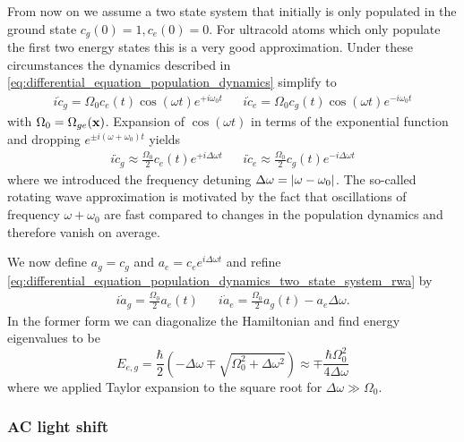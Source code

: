 From now on we assume a two state system that initially is only populated in
the ground state $c_g(0)=1,c_e(0)=0$. For ultracold atoms which only populate
the first two energy states this is a very good approximation. Under these
circumstances the dynamics described in
\cref{eq:differential_equation_population_dynamics} simplify to
\begin{align}
  i\dot{c}_g=\Omega_0c_e(t)\cos(\omega t)e^{+i\omega_0 t} &&
  i\dot{c}_e=\Omega_0c_g(t)\cos(\omega t)e^{-i\omega_0 t}
  \label{eq:differential_equation_population_dynamics_two_state_system}
\end{align}
with $\Omega_0=\Omega_{ge}(\vb{x})$. Expansion of $\cos(\omega t)$ in terms
of the exponential function and dropping $e^{\pm i(\omega+\omega_0)t}$ yields
\begin{align}
  i\dot{c}_g\approx\frac{\Omega_0}{2}c_e(t)e^{+i\Delta\omega t} &&
  i\dot{c}_e\approx\frac{\Omega_0}{2}c_g(t)e^{-i\Delta\omega t}
  \label{eq:differential_equation_population_dynamics_two_state_system_rwa}
\end{align}
where we introduced the frequency detuning
$\Delta\omega=\abs{\omega-\omega_0}$. The so-called rotating wave
approximation is motivated by the fact that oscillations of frequency
$\omega+\omega_0$ are fast compared to changes in the population dynamics and
therefore vanish on average.

We now define $a_g=c_g$ and $a_e=c_e e^{i\Delta\omega t}$ and refine
\cref{eq:differential_equation_population_dynamics_two_state_system_rwa} by
\begin{align}
  i\dot{a}_g=\frac{\Omega_0}{2}a_e(t) &&
  i\dot{a}_e=\frac{\Omega_0}{2}a_g(t)-a_e\Delta\omega
  \label{eq:differential_equation_population_dynamics_two_state_system_shift}.
\end{align}
In the former form we can diagonalize the Hamiltonian and find energy
eigenvalues to be
\begin{equation}
  E_{e,g}
  =\frac{\hbar}{2}\left(-\Delta\omega\mp\sqrt{\Omega_0^2+\Delta\omega^2}\right)
  \approx
  \mp\frac{\hbar\Omega_0^2}{4\Delta\omega}
  \label{eq:eigenvalues_energy_light_shift}
\end{equation}
where we applied Taylor expansion to the square root for
$\Delta\omega\gg\Omega_0$.

\subsubsection{AC light shift}

